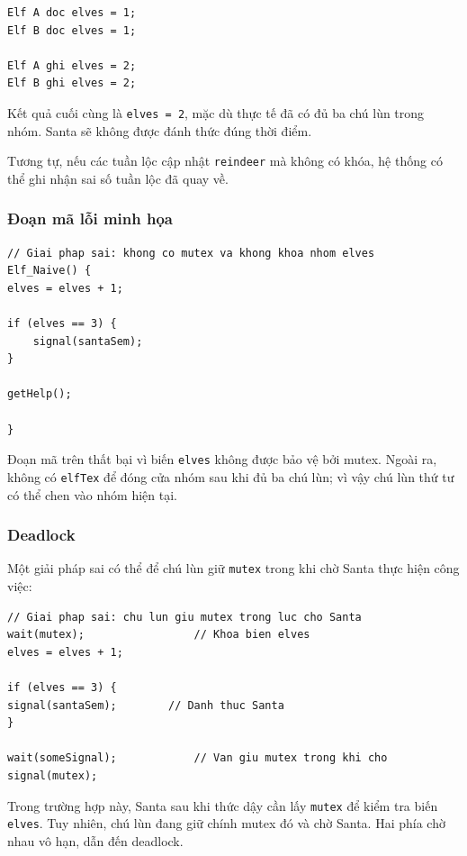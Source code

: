 \begin{lstlisting}
Elf A doc elves = 1;
Elf B doc elves = 1;

Elf A ghi elves = 2;
Elf B ghi elves = 2;
\end{lstlisting}

Kết quả cuối cùng là \texttt{elves = 2}, mặc dù thực tế đã có đủ ba chú
lùn trong nhóm. Santa sẽ không được đánh thức đúng thời điểm.

Tương tự, nếu các tuần lộc cập nhật \texttt{reindeer} mà không có khóa,
hệ thống có thể ghi nhận sai số tuần lộc đã quay về.

\subsubsection*{Đoạn mã lỗi minh họa}

\begin{lstlisting}
// Giai phap sai: khong co mutex va khong khoa nhom elves
Elf_Naive() {
elves = elves + 1;

if (elves == 3) {
    signal(santaSem);
}

getHelp();

}
\end{lstlisting}

Đoạn mã trên thất bại vì biến \texttt{elves} không được bảo vệ bởi
mutex. Ngoài ra, không có \texttt{elfTex} để đóng cửa nhóm sau khi đủ
ba chú lùn; vì vậy chú lùn thứ tư có thể chen vào nhóm hiện tại.

\subsubsection*{Deadlock}

Một giải pháp sai có thể để chú lùn giữ \texttt{mutex} trong khi chờ
Santa thực hiện công việc:

\begin{lstlisting}
// Giai phap sai: chu lun giu mutex trong luc cho Santa
wait(mutex);                 // Khoa bien elves
elves = elves + 1;

if (elves == 3) {
signal(santaSem);        // Danh thuc Santa
}

wait(someSignal);            // Van giu mutex trong khi cho
signal(mutex);
\end{lstlisting}

Trong trường hợp này, Santa sau khi thức dậy cần lấy \texttt{mutex} để
kiểm tra biến \texttt{elves}. Tuy nhiên, chú lùn đang giữ chính mutex
đó và chờ Santa. Hai phía chờ nhau vô hạn, dẫn đến deadlock.

